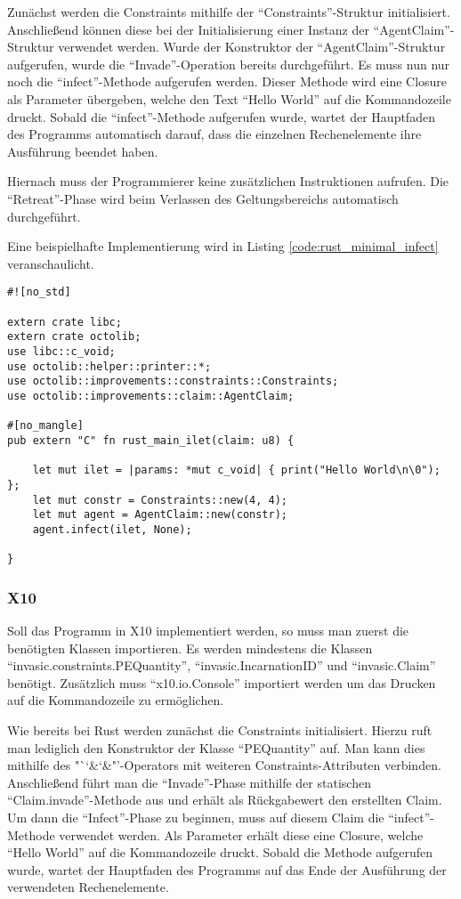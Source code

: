 Zunächst werden die Constraints mithilfe der "`Constraints"'-Struktur initialisiert. Anschließend können diese
bei der Initialisierung einer Instanz der "`AgentClaim"'-Struktur verwendet werden. Wurde der Konstruktor
der "`AgentClaim"'-Struktur aufgerufen, wurde die "`Invade"'-Operation bereits durchgeführt. Es muss nun nur noch
die "`infect"'-Methode aufgerufen werden. Dieser Methode wird eine Closure als Parameter übergeben, welche den
Text "`Hello World"' auf die Kommandozeile druckt. Sobald die "`infect"'-Methode aufgerufen wurde, wartet der
Hauptfaden des Programms automatisch darauf, dass die einzelnen Rechenelemente ihre Ausführung beendet haben.

Hiernach muss der Programmierer keine zusätzlichen Instruktionen aufrufen. Die "`Retreat"'-Phase wird beim
Verlassen des Geltungsbereichs automatisch durchgeführt.

Eine beispielhafte Implementierung wird in Listing \ref{code:rust_minimal_infect} veranschaulicht.

\begin{lstlisting}[float,caption={Minimales Invade, Infect, Retreat in Rust},label=code:rust_minimal_infect]
#![no_std]

extern crate libc;
extern crate octolib;
use libc::c_void;
use octolib::helper::printer::*;
use octolib::improvements::constraints::Constraints;
use octolib::improvements::claim::AgentClaim;

#[no_mangle]
pub extern "C" fn rust_main_ilet(claim: u8) {

    let mut ilet = |params: *mut c_void| { print("Hello World\n\0"); };
    let mut constr = Constraints::new(4, 4);
    let mut agent = AgentClaim::new(constr);
    agent.infect(ilet, None);

}
\end{lstlisting}

\subsubsection{X10}

Soll das Programm in X10 implementiert werden, so muss man zuerst die benötigten Klassen importieren. Es werden 
mindestens die Klassen "`invasic.constraints.PEQuantity"', "`invasic.IncarnationID"' und "`invasic.Claim"'
benötigt. Zusätzlich muss "`x10.io.Console"' importiert werden um das Drucken auf die Kommandozeile zu
ermöglichen.

Wie bereits bei Rust werden zunächst die Constraints initialisiert. Hierzu
ruft man lediglich den Konstruktor der Klasse "`PEQuantity"' auf. Man kann dies mithilfe
des "`\char`&\char`&"'-Operators mit weiteren Constraints-Attributen verbinden.
Anschließend führt man die "`Invade"'-Phase mithilfe der statischen "`Claim.invade"'-Methode aus und erhält
als Rückgabewert den erstellten Claim.
Um dann die "`Infect"'-Phase zu beginnen, muss auf diesem Claim die "`infect"'-Methode verwendet werden.
Als Parameter erhält diese eine Closure, welche "`Hello World"' auf die Kommandozeile druckt.
Sobald die Methode aufgerufen wurde, wartet der Hauptfaden des Programms auf das Ende der Ausführung der
verwendeten Rechenelemente.

